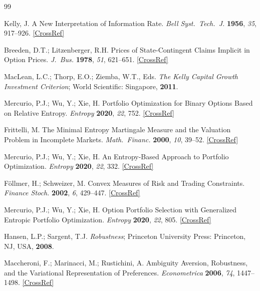 \documentclass[11pt]{article}
\theoremstyle{definition}
\theoremstyle{remark}
\begin{document}

\begin{thebibliography}{99}

Kelly, J. A New Interpretation of Information Rate.
\emph{Bell Syst.\ Tech.\ J.} \textbf{1956}, \emph{35}, 917--926.
\href{https://doi.org/10.1002/j.1538-7305.1956.tb03809.x}{[CrossRef]}

Breeden, D.T.; Litzenberger, R.H. Prices of State-Contingent Claims
Implicit in Option Prices. \emph{J.\ Bus.} \textbf{1978}, \emph{51},
621--651.
\href{https://doi.org/10.1086/296025}{[CrossRef]}

MacLean, L.C.; Thorp, E.O.; Ziemba, W.T., Eds. \emph{The Kelly
Capital Growth Investment Criterion}; World Scientific: Singapore,
\textbf{2011}.

Mercurio, P.J.; Wu, Y.; Xie, H. Portfolio Optimization for Binary
Options Based on Relative Entropy. \emph{Entropy} \textbf{2020},
\emph{22}, 752.
\href{https://doi.org/10.3390/e22070752}{[CrossRef]}

Frittelli, M. The Minimal Entropy Martingale Measure and the
Valuation Problem in Incomplete Markets. \emph{Math.\ Financ.}
\textbf{2000}, \emph{10}, 39--52.
\href{https://doi.org/10.1111/1467-9965.00079}{[CrossRef]}

Mercurio, P.J.; Wu, Y.; Xie, H. An Entropy-Based Approach to
Portfolio Optimization. \emph{Entropy} \textbf{2020}, \emph{22},
332.
\href{https://doi.org/10.3390/e22030332}{[CrossRef]}

F\"ollmer, H.; Schweizer, M. Convex Measures of Risk and Trading
Constraints. \emph{Finance Stoch.} \textbf{2002}, \emph{6},
429--447.
\href{https://doi.org/10.1007/s007800200072}{[CrossRef]}

Mercurio, P.J.; Wu, Y.; Xie, H. Option Portfolio Selection with
Generalized Entropic Portfolio Optimization. \emph{Entropy}
\textbf{2020}, \emph{22}, 805.
\href{https://doi.org/10.3390/e22080805}{[CrossRef]}

Hansen, L.P.; Sargent, T.J. \emph{Robustness}; Princeton University
Press: Princeton, NJ, USA, \textbf{2008}.

Maccheroni, F.; Marinacci, M.; Rustichini, A. Ambiguity Aversion,
Robustness, and the Variational Representation of Preferences.
\emph{Econometrica} \textbf{2006}, \emph{74}, 1447--1498.
\href{https://doi.org/10.1111/j.1468-0262.2006.00716.x}{[CrossRef]}


\end{thebibliography}
\end{document}
